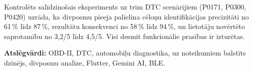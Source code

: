 Kontrolēts salīdzinošais eksperiments uz trim DTC scenārijiem (P0171, P0300, P0420) uzrāda, ka divposmu pieeja palielina cēloņu identifikācijas precizitāti no 61\,\% līdz 87\,\%, rezultātu konsekvenci no 58\,\% līdz 94\,\%, un lietotāju novērtēto saprotamību no 3,2/5 līdz 4,5/5.
Visi desmit funkcionālie prasības ir izturētas.

\medskip
\textbf{Atslēgvārdi:} OBD-II, DTC, automobiļu diagnostika, uz noteikumiem balstīts dzinējs,
divposmu analīze, Flutter, Gemini AI, BLE.

\clearpage
